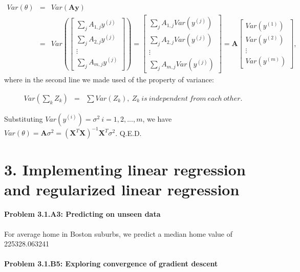 \documentclass[english,11pt]{article}
\begin{document}
\begin{eqnarray}
Var(\theta) & = & Var(\boldsymbol{A}\boldsymbol{y})\\
 & = & Var(\left[\begin{array}{c}
\sum_{j}A_{1,j}y^{(j)}\\
\sum_{j}A_{2,j}y^{(j)}\\
\vdots\\
\sum_{j}A_{m,j}y^{(j)}
\end{array}\right])=\left[\begin{array}{c}
\sum_{j}A_{1,j}Var(y^{(j)})\\
\sum_{j}A_{2,j}Var(y^{(j)})\\
\vdots\\
\sum_{j}A_{m,j}Var(y^{(j)})
\end{array}\right]=\boldsymbol{A}\left[\begin{array}{c}
Var(y^{(1)})\\
Var(y^{(2)})\\
\vdots\\
Var(y^{(m)})
\end{array}\right],
\end{eqnarray}
where in the second line we made used of the property of variance:

\begin{eqnarray}
Var(\sum_{k}Z_{k}) & = & \sum Var(Z_{k}),\ Z_{k}\ is\ independent\ from\ each\ other.
\end{eqnarray}

Substituting $Var(y^{(i)})=\sigma^{2}\ i=1,2,...,m$, we have $Var(\theta)=\boldsymbol{A}\sigma^{2}=\left(\boldsymbol{X}^{T}\boldsymbol{X}\right)^{-1}\boldsymbol{X}^{T}\sigma^{2}$.
Q.E.D.


\part*{3. Implementing linear regression and regularized linear regression}

\subsection*{Problem 3.1.A3: Predicting on unseen data}

For average home in Boston suburbs, we predict a median home value of 225328.063241

\subsection*{Problem 3.1.B5: Exploring convergence of gradient descent}
\end{document}
